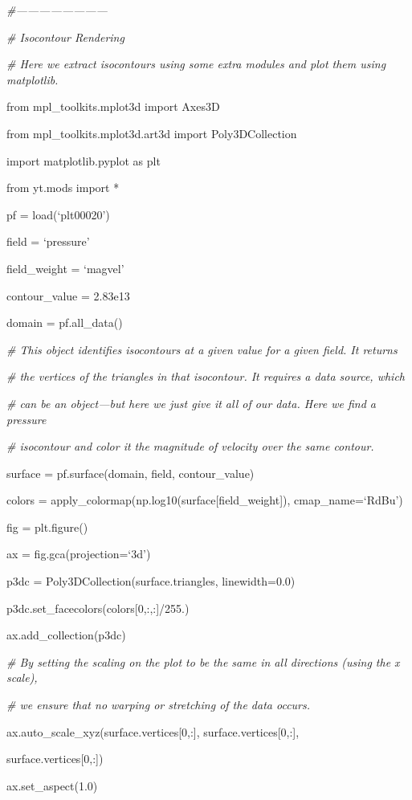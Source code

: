 {\it\#------------------------}

{\it\# Isocontour Rendering}
{\setlength{\parskip}{0pt}

{\it\# Here we extract isocontours using some extra modules and plot them using matplotlib.}

from mpl\_toolkits.mplot3d import Axes3D
}

from mpl\_toolkits.mplot3d.art3d import Poly3DCollection

import matplotlib.pyplot as plt

from yt.mods import *

pf = load(`plt00020')

field = `pressure'

field\_weight = `magvel'

contour\_value = 2.83e13

domain = pf.all\_data()

{\it\# This object identifies isocontours at a given value for a given field. It returns}
{\setlength{\parskip}{0pt}

{\it\# the vertices of the triangles in that isocontour. It requires a data source, which}

{\it\# can be an object---but here we just give it all of our data. Here we find a pressure}

{\it\# isocontour and color it the magnitude of velocity over the same contour.}

surface = pf.surface(domain, field, contour\_value)
}

colors = apply\_colormap(np.log10(surface[field\_weight]), cmap\_name=`RdBu')

fig = plt.figure()

ax = fig.gca(projection=`3d')

p3dc = Poly3DCollection(surface.triangles, linewidth=0.0)

p3dc.set\_facecolors(colors[0,:,:]/255.)

ax.add\_collection(p3dc)

{\it\# By setting the scaling on the plot to be the same in all directions (using the x scale),}
{\setlength{\parskip}{0pt}

{\it\# we ensure that no warping or stretching of the data occurs.}

ax.auto\_scale\_xyz(surface.vertices[0,:], surface.vertices[0,:],
}

{\setlength{\parindent}{87pt}surface.vertices[0,:])}

ax.set\_aspect(1.0)

